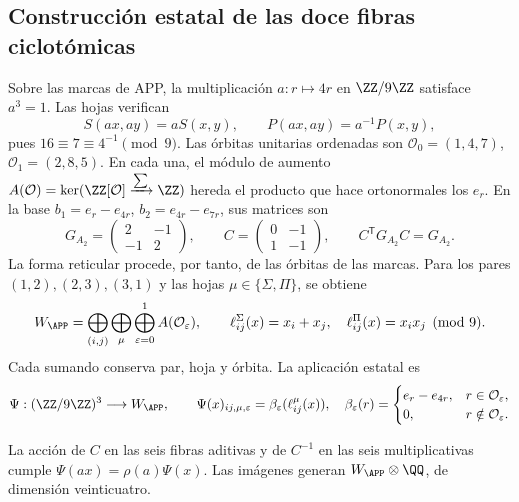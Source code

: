 \subsection{Construcción estatal de las doce fibras ciclotómicas}
\label{nuclear:fibras-app-witt}
Sobre las marcas de APP, la multiplicación \(a:r\mapsto4r\) en
\(\ZZ/9\ZZ\) satisface \(a^3=1\). Las hojas verifican
\[
 S(ax,ay)=aS(x,y),\qquad P(ax,ay)=a^{-1}P(x,y),
\]
pues \(16\equiv7\equiv4^{-1}\pmod9\). Las órbitas unitarias
ordenadas son \(\mathcal O_0=(1,4,7)\), \(\mathcal O_1=(2,8,5)\).
En cada una, el módulo de aumento
\(A(\mathcal O)=\ker(\ZZ[\mathcal O]\xrightarrow{\sum}\ZZ)\)
hereda el producto que hace ortonormales los \(e_r\). En la base
\(b_1=e_r-e_{4r}\), \(b_2=e_{4r}-e_{7r}\), sus matrices son
\[
 G_{A_2}=\begin{pmatrix}2&-1\\-1&2\end{pmatrix},\qquad
 C=\begin{pmatrix}0&-1\\1&-1\end{pmatrix},\qquad
 C^{\mathsf T}G_{A_2}C=G_{A_2}.
\]
La forma reticular procede, por tanto, de las órbitas de las marcas.
Para los pares \((1,2),(2,3),(3,1)\) y las hojas
\(\mu\in\{\Sigma,\Pi\}\), se obtiene
\[
 W_{\APP}=\bigoplus_{(i,j)}\bigoplus_\mu\bigoplus_{\varepsilon=0}^1
 A(\mathcal O_\varepsilon),\qquad
 \ell^\Sigma_{ij}(x)=x_i+x_j,\quad
 \ell^\Pi_{ij}(x)=x_ix_j\pmod9.
\]
Cada sumando conserva par, hoja y órbita. La aplicación estatal es
\[
 \Psi:(\ZZ/9\ZZ)^3\longrightarrow W_{\APP},\qquad
 \Psi(x)_{ij,\mu,\varepsilon}=\beta_\varepsilon(\ell^\mu_{ij}(x)),
 \quad
 \beta_\varepsilon(r)=
 \begin{cases}e_r-e_{4r},&r\in\mathcal O_\varepsilon,\\0,&r\notin\mathcal O_\varepsilon.
 \end{cases}
\]
\begin{proposition}
\label{nuclear:psi-rango}
La acción de \(C\) en las seis fibras aditivas y de \(C^{-1}\) en
las seis multiplicativas cumple \(\Psi(ax)=\rho(a)\Psi(x)\).
Las imágenes generan \(W_{\APP}\otimes\QQ\), de dimensión veinticuatro.
\end{proposition}
